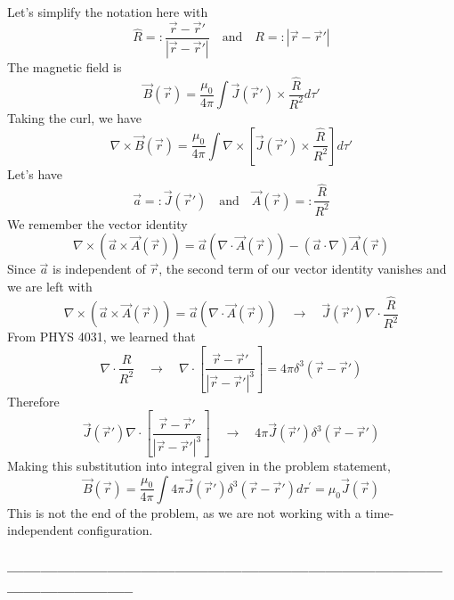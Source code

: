 \documentclass[a4paper,12pt]{article} %
\begin{document}
Let's simplify the notation here with
$$ \hat{R} =: \frac{\vec{r} - \overrightarrow{r}'}{|\vec{r} - \overrightarrow{r}'|} \quad \text{and} \quad R =: |\vec{r} - \overrightarrow{r}'| $$
The magnetic field is
$$ \vec{B}(\vec{r}) = \frac{\mu_0}{4\pi} \int \vec{J}(\overrightarrow{r}')\times \frac{\hat{R}}{R^2} d\tau' $$
Taking the curl, we have
$$ \nabla \times \vec{B}(\vec{r}) = \frac{\mu_0}{4\pi} \int \nabla \times \left[ \vec{J}(\overrightarrow{r}')\times \frac{\hat{R}}{R^2} \right] d\tau'$$
Let's have
$$ \vec{a} =: \vec{J}(\overrightarrow{r}') \quad\text{and}\quad \vec{A}(\vec{r}) =: \frac{\hat{R}}{R^2} $$
We remember the vector identity
$$ \nabla\times\left(\vec{a} \times \vec{A}(\vec{r})\right) = \vec{a}\left(\nabla\cdot\vec{A}(\vec{r})\right) - \left(\vec{a}\cdot\nabla\right)\vec{A}(\vec{r}) $$
Since $\vec{a}$ is independent of $\vec{r}$, the second term of our vector identity vanishes and we are left with
$$ \nabla\times\left(\vec{a} \times \vec{A}(\vec{r})\right) = \vec{a}\left(\nabla\cdot\vec{A}(\vec{r})\right) \quad\rightarrow\quad \vec{J}(\overrightarrow{r}')\nabla \cdot \frac{\hat{R}}{R^2} $$
From PHYS 4031, we learned that
$$ \nabla \cdot \frac{\hat{R}}{R^2} \quad\rightarrow\quad \nabla \cdot \left[\frac{\vec{r} - \overrightarrow{r}'}{|\vec{r} - \overrightarrow{r}'|^3}\right] = 4\pi\delta^3(\vec{r} - \overrightarrow{r}') $$
Therefore
$$ \vec{J}(\overrightarrow{r}')\nabla \cdot \left[\frac{\vec{r} - \overrightarrow{r}'}{|\vec{r} - \overrightarrow{r}'|^3}\right] \quad\rightarrow\quad 4\pi\vec{J}(\overrightarrow{r}')\delta^3(\vec{r} - \overrightarrow{r}') $$
Making this substitution into integral given in the problem statement,
$$ \boxed{\vec{B}(\vec{r})=\frac{\mu_0}{4 \pi} \int 4\pi\vec{J}(\overrightarrow{r}')\delta^3(\vec{r} - \overrightarrow{r}') d \tau^{\prime} = \mu_0\vec{J}(\vec{r})} $$
This is not the end of the problem, as we are not working with a time-independent configuration.

\subsubsection*{-----------------------------------------------------------------------------------------------------}
\end{document}
